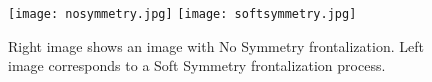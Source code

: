 \begin{figure}[H]
    \centering
	\texttt{[image: nosymmetry.jpg]}
	\texttt{[image: softsymmetry.jpg]}    
    \caption{Right image shows an image with No Symmetry frontalization. Left image corresponds to a Soft Symmetry frontalization process.}
    \label{image:symmetry}
\end{figure}
